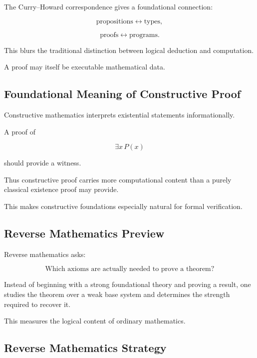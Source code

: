 The Curry--Howard correspondence gives a foundational connection:

\[
\boxed{
\text{propositions}
\leftrightarrow
\text{types},
}
\]

\[
\boxed{
\text{proofs}
\leftrightarrow
\text{programs}.
}
\]

This blurs the traditional distinction between logical deduction and
computation.

A proof may itself be executable mathematical data.

\subsection{Foundational Meaning of Constructive Proof}
\label{subsec:foundational-constructive-proof}

Constructive mathematics interprets existential statements informationally.

A proof of

\[
\exists x\,P(x)
\]

should provide a witness.

Thus constructive proof carries more computational content than a purely
classical existence proof may provide.

This makes constructive foundations especially natural for formal
verification.

\subsection{Reverse Mathematics Preview}
\label{subsec:reverse-mathematics-preview}

Reverse mathematics asks:

\[
\boxed{
\text{Which axioms are actually needed to prove a theorem?}
}
\]

Instead of beginning with a strong foundational theory and proving a
result, one studies the theorem over a weak base system and determines the
strength required to recover it.

This measures the logical content of ordinary mathematics.

\subsection{Reverse Mathematics Strategy}
\label{subsec:reverse-mathematics-strategy}

